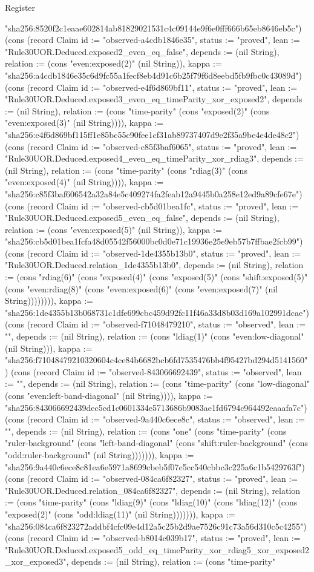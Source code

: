 \begin{lexlean}{Register}
\begin{semanticmodule}
{"sha256:8520f2c1eaae602814ab81829021531c4c09144e9f6e0fff666b65eb8646eb5c"}) (cons (record Claim {id := "observed-a4cdb1846e35", status := "proved", lean := "Rule30UOR.Deduced.exposed2_even_eq_false", depends := (nil String), relation := (cons "even:exposed(2)" (nil String)), kappa := "sha256:a4cdb1846e35c6d9fc55a1fecf8eb4d91c6b25f79f6d8eebd5fb9fbc0c43089d"}) (cons (record Claim {id := "observed-e4f6d869bf11", status := "proved", lean := "Rule30UOR.Deduced.exposed3_even_eq_timeParity_xor_exposed2", depends := (nil String), relation := (cons "time-parity" (cons "exposed(2)" (cons "even:exposed(3)" (nil String)))), kappa := "sha256:e4f6d869bf115ff1e85bc55c90fee1cf31ab89737407d9e2f35a9be4e4de48c2"}) (cons (record Claim {id := "observed-c85f3baf6065", status := "proved", lean := "Rule30UOR.Deduced.exposed4_even_eq_timeParity_xor_rdiag3", depends := (nil String), relation := (cons "time-parity" (cons "rdiag(3)" (cons "even:exposed(4)" (nil String)))), kappa := "sha256:c85f3baf606542a32a84e5c409274fa2feab12a9445b0a258e12ed9a89cfe67e"}) (cons (record Claim {id := "observed-cb5d01bea1fc", status := "proved", lean := "Rule30UOR.Deduced.exposed5_even_eq_false", depends := (nil String), relation := (cons "even:exposed(5)" (nil String)), kappa := "sha256:cb5d01bea1fcfa48d05542f56000bc0d0e71c19936e25e9eb57b7ffbae2fcb99"}) (cons (record Claim {id := "observed-1de4355b13b0", status := "proved", lean := "Rule30UOR.Deduced.relation_1de4355b13b0", depends := (nil String), relation := (cons "rdiag(6)" (cons "exposed(4)" (cons "exposed(5)" (cons "shift:exposed(5)" (cons "even:rdiag(8)" (cons "even:exposed(6)" (cons "even:exposed(7)" (nil String)))))))), kappa := "sha256:1de4355b13b068731c1dfe699cbc459d92fc11f46a33d8b03d169a102991dcae"}) (cons (record Claim {id := "observed-f71048479210", status := "observed", lean := "", depends := (nil String), relation := (cons "ldiag(1)" (cons "even:low-diagonal" (nil String))), kappa := "sha256:f71048479210320604c4ce84b6682bcb6fd7535476bb4f95427bd294d5141560"}) (cons (record Claim {id := "observed-843066692439", status := "observed", lean := "", depends := (nil String), relation := (cons "time-parity" (cons "low-diagonal" (cons "even:left-band-diagonal" (nil String)))), kappa := "sha256:843066692439dec5cd1c0601334e5713686b9083ae1fd6794c964492eaaafa7c"}) (cons (record Claim {id := "observed-9a440c6ece8c", status := "observed", lean := "", depends := (nil String), relation := (cons "one" (cons "time-parity" (cons "ruler-background" (cons "left-band-diagonal" (cons "shift:ruler-background" (cons "odd:ruler-background" (nil String))))))), kappa := "sha256:9a440c6ece8c81ea6e5971a8699cbeb5f07c5cc540cbbc3c225a6c1b5429763f"}) (cons (record Claim {id := "observed-084ca6f82327", status := "proved", lean := "Rule30UOR.Deduced.relation_084ca6f82327", depends := (nil String), relation := (cons "time-parity" (cons "ldiag(9)" (cons "ldiag(10)" (cons "ldiag(12)" (cons "exposed(2)" (cons "odd:ldiag(11)" (nil String))))))), kappa := "sha256:084ca6f823272addbf4cfc09e4d12a5c25b2d9ae7526c91c73a56d310c5c4255"}) (cons (record Claim {id := "observed-b8014c039b17", status := "proved", lean := "Rule30UOR.Deduced.exposed5_odd_eq_timeParity_xor_rdiag5_xor_exposed2_xor_exposed3", depends := (nil String), relation := (cons "time-parity" }
\end{semanticmodule}
\end{lexlean}
